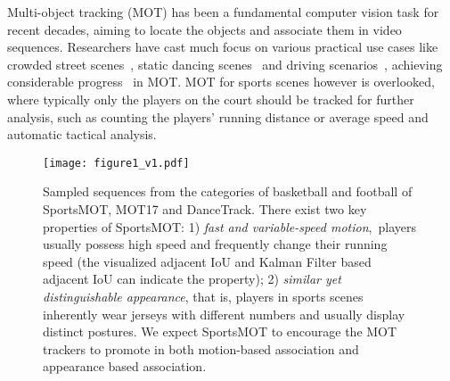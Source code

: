 \documentclass[10pt,twocolumn,letterpaper]{article}
\begin{document}
Multi-object tracking (MOT) has been a fundamental computer vision task for recent decades, aiming to locate the objects and associate them in video sequences. 
Researchers have cast much focus on various practical use cases like crowded street scenes~\cite{milan2016mot16,dendorfer2020mot20}, static dancing scenes~\cite{sun2022dancetrack} and driving scenarios~\cite{geiger2012we}, achieving considerable progress~\cite{bergmann2019tracking,bewley2016simple,wang2020towards,wang2021multiple,xu2021transcenter,peng2020chained,wu2021track} in MOT. 
MOT for sports scenes however is overlooked, where typically only the players on the court should be tracked for further analysis, such as counting the players' running distance or average speed and automatic tactical analysis.

\begin{figure*}[pt]
\centering
\texttt{[image: figure1\_v1.pdf]}
\vspace{-3mm}
\caption{Sampled sequences from the categories of basketball and football of SportsMOT, MOT17 and DanceTrack. There exist two key properties of SportsMOT: 1) \textit{fast and variable-speed motion},~\ie players usually possess high speed and frequently change their running speed (the visualized adjacent IoU and Kalman Filter based adjacent IoU can indicate the property); 2) \textit{similar yet distinguishable appearance}, that is, players in sports scenes inherently wear jerseys with different numbers and usually display distinct postures. We expect SportsMOT to encourage the MOT trackers to promote in both motion-based association and appearance based association.}
\vspace{-5mm}
\label{fig:1}
\end{figure*}
\end{document}
